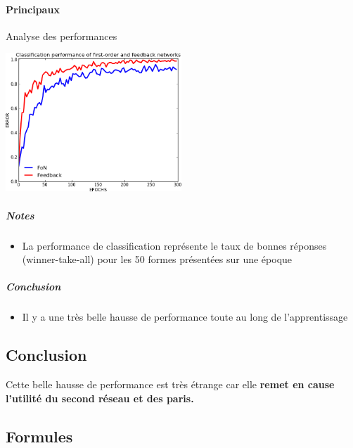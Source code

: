     \paragraph{Principaux}
      Analyse des performances
      \begin{center}
	\includegraphics[width=250px]{data/expF5/perff.png}
      \end{center}
      \subparagraph{Notes}
	\begin{itemize}
	  \item La performance de classification représente le taux de bonnes réponses (winner-take-all) pour les 50 formes présentées sur une époque
	\end{itemize}
      \subparagraph{Conclusion}
	\begin{itemize}
	  \item Il y a une très belle hausse de performance toute au long de l'apprentissage
	\end{itemize}


  \subsection{Conclusion}
  Cette belle hausse de performance est très étrange car elle \textbf{remet en cause l'utilité du second réseau et des paris.}
  
  

  \newpage 
  \subsection{Formules}
    
    


